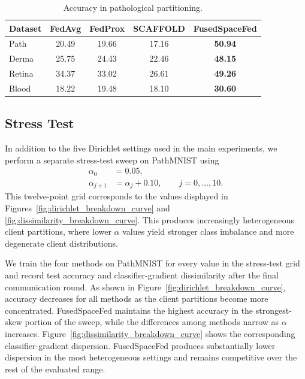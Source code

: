 \documentclass[twoside]{article}
\theoremstyle{thmstyleone}%
\theoremstyle{thmstyletwo}%
\theoremstyle{thmstylethree}%
\begin{document}
\begin{table}[t]
\centering
\caption{Accuracy in pathological partitioning.}
\label{tab:pathological}
\small
\setlength{\tabcolsep}{2pt}
\begin{tabular}{@{}lcccc@{}}
\toprule
Dataset & FedAvg & FedProx & SCAFFOLD & \textbf{FusedSpaceFed} \\
\midrule
Path   & 20.49 & 19.66 & 17.16 & \textbf{50.94} \\
Derma  & 25.75 & 24.43 & 22.46 & \textbf{48.15} \\
Retina & 34.37 & 33.02 & 26.61 & \textbf{49.26} \\
Blood  & 18.22 & 19.48 & 18.10 & \textbf{30.60} \\
\bottomrule
\end{tabular}
\end{table}



\subsection{Stress Test}
In addition to the five Dirichlet settings used in the main experiments, we
perform a separate stress-test sweep on PathMNIST using
\[
\begin{aligned}
\alpha_0 &= 0.05,\\
\alpha_{j+1} &= \alpha_j + 0.10,
\qquad j=0,\ldots,10.
\end{aligned}
\]
This twelve-point grid corresponds to the values displayed in
Figures~\ref{fig:dirichlet_breakdown_curve} and
\ref{fig:dissimilarity_breakdown_curve}.
This produces increasingly heterogeneous client partitions, where lower $\alpha$ values yield stronger class imbalance and more degenerate client distributions.

We train the four methods on PathMNIST for every
value in the stress-test grid and record test accuracy and classifier-gradient
dissimilarity after the final communication round. As shown in
Figure~\ref{fig:dirichlet_breakdown_curve}, accuracy decreases for all methods
as the client partitions become more concentrated. FusedSpaceFed maintains the
highest accuracy in the strongest-skew portion of the sweep, while the
differences among methods narrow as $\alpha$ increases.
Figure~\ref{fig:dissimilarity_breakdown_curve} shows the corresponding
classifier-gradient dispersion. FusedSpaceFed produces substantially lower
dispersion in the most heterogeneous settings and remains competitive over the
rest of the evaluated range.
\end{document}

